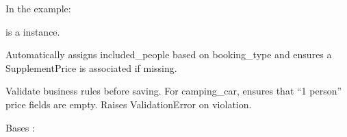 \documentclass[letterpaper,10pt,french]{sphinxmanual}
\begin{document}
\begin{fulllineitems}
\begin{fulllineitems}
\sphinxAtStartPar
In the example:

\begin{sphinxVerbatim}[commandchars=\\\{\}]
       
\end{sphinxVerbatim}

\sphinxAtStartPar
{} is a  instance.

\end{fulllineitems}


\begin{fulllineitems}
\label{\detokenize{index:bookings.models.Price.save}}
\pysigstartsignatures
\pysiglinewithargsret
{}
{\sphinxparamcomma {}}
{}
\pysigstopsignatures
\sphinxAtStartPar
Automatically assigns included\_people based on booking\_type and
ensures a SupplementPrice is associated if missing.

\end{fulllineitems}


\begin{fulllineitems}
\label{\detokenize{index:bookings.models.Price.clean}}
\pysigstartsignatures
\pysiglinewithargsret
{}
{}
{}
\pysigstopsignatures
\sphinxAtStartPar
Validate business rules before saving.
For camping\_car, ensures that “1 person” price fields are empty.
Raises ValidationError on violation.

\end{fulllineitems}


\begin{fulllineitems}
\label{\detokenize{index:bookings.models.Price.DoesNotExist}}
\pysigstartsignatures
\pysigline
{}
\pysigstopsignatures
\sphinxAtStartPar
Bases : 


\end{fulllineitems}
\end{fulllineitems}
\end{document}
